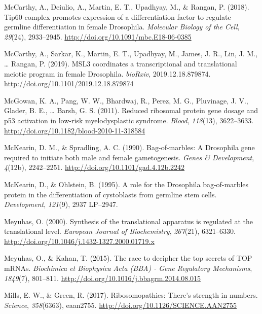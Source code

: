 \documentclass[12pt,twoside]{reedthesis}
\newlength{\cslhangindent}
\newenvironment{cslreferences}%
  {\setlength{\parindent}{0pt}%
  \everypar{\setlength{\hangindent}{\cslhangindent}}\ignorespaces}%
  {\par}
\begin{document}
\begin{cslreferences}
\leavevmode\hypertarget{ref-McCarthy2018h}{}%
McCarthy, A., Deiulio, A., Martin, E. T., Upadhyay, M., \& Rangan, P. (2018). Tip60 complex promotes expression of a differentiation factor to regulate germline differentiation in female Drosophila. \emph{Molecular Biology of the Cell}, \emph{29}(24), 2933--2945. \url{http://doi.org/10.1091/mbc.E18-06-0385}

\leavevmode\hypertarget{ref-mccarthyMSL3CoordinatesTranscriptional2019}{}%
McCarthy, A., Sarkar, K., Martin, E. T., Upadhyay, M., James, J. R., Lin, J. M., \ldots{} Rangan, P. (2019). MSL3 coordinates a transcriptional and translational meiotic program in female Drosophila. \emph{bioRxiv}, 2019.12.18.879874. \url{http://doi.org/10.1101/2019.12.18.879874}

\leavevmode\hypertarget{ref-mcgowanReducedRibosomalProtein2011}{}%
McGowan, K. A., Pang, W. W., Bhardwaj, R., Perez, M. G., Pluvinage, J. V., Glader, B. E., \ldots{} Barsh, G. S. (2011). Reduced ribosomal protein gene dosage and p53 activation in low-risk myelodysplastic syndrome. \emph{Blood}, \emph{118}(13), 3622--3633. \url{http://doi.org/10.1182/blood-2010-11-318584}

\leavevmode\hypertarget{ref-McKearin1990e}{}%
McKearin, D. M., \& Spradling, A. C. (1990). Bag-of-marbles: A Drosophila gene required to initiate both male and female gametogenesis. \emph{Genes \& Development}, \emph{4}(12b), 2242--2251. \url{http://doi.org/10.1101/gad.4.12b.2242}

\leavevmode\hypertarget{ref-McKearin1995b}{}%
McKearin, D., \& Ohlstein, B. (1995). A role for the Drosophila bag-of-marbles protein in the differentiation of cystoblasts from germline stem cells. \emph{Development}, \emph{121}(9), 2937 LP--2947.

\leavevmode\hypertarget{ref-meyuhasSynthesisTranslationalApparatus2000}{}%
Meyuhas, O. (2000). Synthesis of the translational apparatus is regulated at the translational level. \emph{European Journal of Biochemistry}, \emph{267}(21), 6321--6330. \url{http://doi.org/10.1046/j.1432-1327.2000.01719.x}

\leavevmode\hypertarget{ref-meyuhasRaceDecipherTop2015}{}%
Meyuhas, O., \& Kahan, T. (2015). The race to decipher the top secrets of TOP mRNAs. \emph{Biochimica et Biophysica Acta (BBA) - Gene Regulatory Mechanisms}, \emph{1849}(7), 801--811. \url{http://doi.org/10.1016/j.bbagrm.2014.08.015}

\leavevmode\hypertarget{ref-Mills2017c}{}%
Mills, E. W., \& Green, R. (2017). Ribosomopathies: There's strength in numbers. \emph{Science}, \emph{358}(6363), eaan2755. \url{http://doi.org/10.1126/SCIENCE.AAN2755}


\end{cslreferences}
\end{document}
